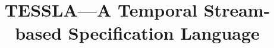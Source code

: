 \documentclass{article}
\title{TESSLA---A Temporal Stream-based Specification Language}
\title{\thetitle}
\begin{document}
\maketitle









\appendix



\nocite{*}


%
\end{document}
